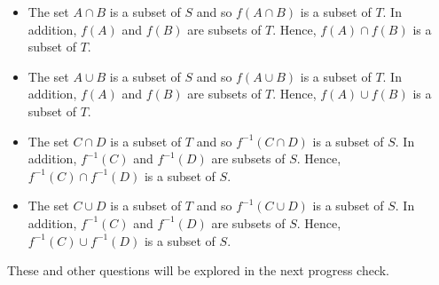\begin{itemize}
\item The set $A \cap B$ is a subset of $S$ and so $f ( A \cap B )$ is a subset of $T$.  In addition, $f ( A )$ and $f ( B )$ are subsets of $T$.  Hence, 
$f ( A ) \cap f ( B )$ is a subset of $T$.


\item The set $A \cup B$ is a subset of $S$ and so $f ( A \cup B )$ is a subset of $T$.  In addition, $f ( A )$ and $f ( B )$ are subsets of $T$.  Hence, 
$f ( A ) \cup f ( B )$ is a subset of $T$.


\item The set $C \cap D$ is a subset of $T$ and so $f^{-1} ( C \cap D )$ is a subset of $S$.  In addition, $f^{-1} ( C )$ and $f^{-1} ( D )$ are subsets of $S$. Hence, $f^{-1} ( C ) \cap f^{-1} ( D )$ is a subset of $S$.


\item The set $C \cup D$ is a subset of $T$ and so $f^{-1} ( C \cup D )$ is a subset of $S$.  In addition, $f^{-1} ( C )$ and $f^{-1} ( D )$ are subsets of $S$. Hence, $f^{-1} ( C ) \cup f^{-1} ( D )$ is a subset of $S$.

\end{itemize}
These and other questions will be explored in the next progress check.
\hbreak

